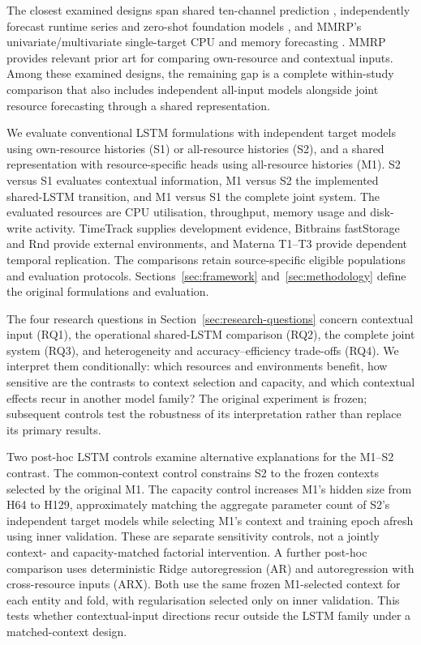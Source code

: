 \documentclass[a4paper,fleqn]{cas-dc}
\begin{document}
The closest examined designs span shared ten-channel prediction
\citep{Ullah2023CloudBiLSTM}, independently forecast runtime series and
zero-shot foundation models \citep{DiMenna2026RuntimeForecasting}, and MMRP's
univariate/multivariate single-target CPU and memory forecasting
\citep{Tripathi2025MMRP}. MMRP provides relevant prior art for comparing
own-resource and contextual inputs. Among these examined designs, the
remaining gap is a complete within-study comparison that also includes
independent all-input models alongside joint resource forecasting through a
shared representation.

We evaluate conventional LSTM formulations with independent target models
using own-resource histories (S1) or all-resource histories (S2), and a shared
representation with resource-specific heads using all-resource histories
(M1). S2 versus S1 evaluates contextual information, M1 versus S2 the
implemented shared-LSTM transition, and M1 versus S1 the complete joint
system. The evaluated resources are CPU utilisation, throughput, memory usage
and disk-write activity. TimeTrack supplies development evidence, Bitbrains
fastStorage and Rnd provide external environments, and Materna T1--T3 provide
dependent temporal replication. The comparisons retain source-specific
eligible populations and evaluation protocols.
Sections~\ref{sec:framework} and~\ref{sec:methodology} define the original
formulations and evaluation.

The four research questions in Section~\ref{sec:research-questions} concern
contextual input (RQ1), the operational shared-LSTM comparison (RQ2), the
complete joint system (RQ3), and heterogeneity and accuracy--efficiency
trade-offs (RQ4). We interpret them conditionally: which resources and
environments benefit, how sensitive are the contrasts to context selection
and capacity, and which contextual effects recur in another model family?
The original experiment is frozen; subsequent controls test the robustness
of its interpretation rather than replace its primary results.

Two post-hoc LSTM controls examine alternative explanations for the M1--S2
contrast. The common-context control constrains S2 to the frozen contexts
selected by the original M1. The capacity control increases M1's hidden size
from H64 to H129, approximately matching the aggregate parameter count of
S2's independent target models while selecting M1's context and training
epoch afresh using inner validation. These are separate sensitivity controls,
not a jointly context- and capacity-matched factorial intervention.
A further post-hoc comparison uses deterministic Ridge autoregression (AR)
and autoregression with cross-resource inputs (ARX). Both use the same frozen
M1-selected context for each entity and fold, with regularisation selected
only on inner validation. This tests whether contextual-input directions
recur outside the LSTM family under a matched-context design.
\end{document}
